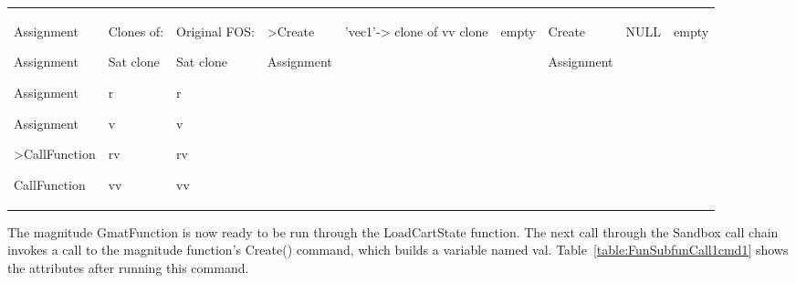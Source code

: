 \begin{center}
\begin{supertabular}{|p{0.75in}|p{0.45in}|p{0.45in}|p{0.69in}|p{0.45in}|p{0.45in}|p{0.69in}|
p{0.44in}|p{0.44in}|}
\begin{small}
Assignment

Assignment

Assignment

Assignment

>CallFunction

CallFunction
\end{small} &
\begin{small}
Clones of:

Sat clone

r

v

rv

vv
\end{small} &
\begin{small}
Original FOS:

Sat clone

r

v

rv

vv
\end{small} &
\begin{small}
>Create

Assignment
\end{small} &
\begin{small}
'vec1'-> clone of vv clone
\end{small} &
\begin{small}
empty
\end{small} &
\begin{small}
Create

Assignment
\end{small} &
\begin{small}
NULL
\end{small} &
\begin{small}
empty
\end{small} \\
\end{supertabular}
\end{center}

The magnitude GmatFunction is now ready to be run through the LoadCartState function.  The next call
through the Sandbox call chain invokes a call to the magnitude function's Create() command, which
builds a variable named val.  Table~\ref{table:FunSubfunCall1cmd1} shows the attributes after
running this command.

